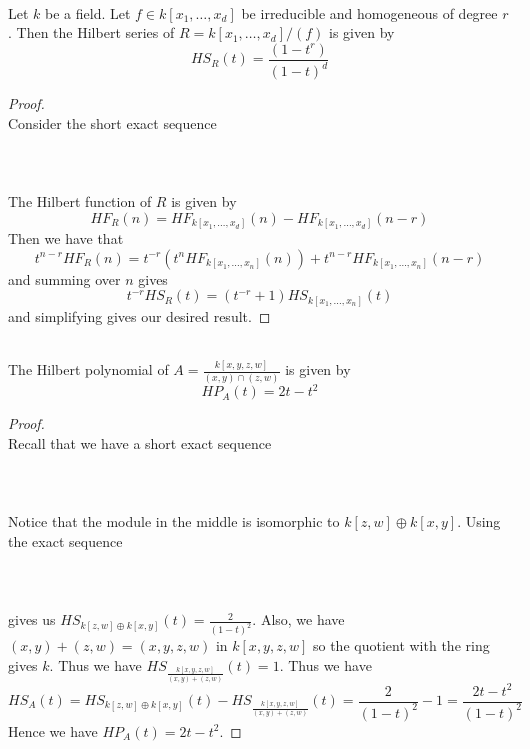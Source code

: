 \documentclass[a4paper]{article}
\begin{document}
\begin{eg}{}{}\\
Let $k$ be a field. Let $f\in k[x_1,\dots,x_d]$ be irreducible and homogeneous of degree $r$. Then the Hilbert series of $R=k[x_1,\dots,x_d]/(f)$ is given by $$HS_R(t)=\frac{(1-t^r)}{(1-t)^d}$$
\begin{proof}\\
Consider the short exact sequence \\~\\
 \\~\\
The Hilbert function of $R$ is given by $$HF_R(n)=HF_{k[x_1,\dots,x_d]}(n)-HF_{k[x_1,\dots,x_d]}(n-r)$$ Then we have that $$t^{n-r}HF_R(n)=t^{-r}(t^n HF_{k[x_1,\dots,x_n]}(n))+t^{n-r}HF_{k[x_1,\dots,x_n]}(n-r)$$ and summing over $n$ gives $$t^{-r}HS_R(t)=(t^{-r}+1)HS_{k[x_1,\dots,x_n]}(t)$$ and simplifying gives our desired result. 
\end{proof}
\end{eg}

\begin{eg}{}{}\\
The Hilbert polynomial of $A=\frac{k[x,y,z,w]}{(x,y)\cap(z,w)}$ is given by $$HP_A(t)=2t-t^2$$
\begin{proof}\\
Recall that we have a short exact sequence \\~\\
\\~\\
Notice that the module in the middle is isomorphic to $k[z,w]\oplus k[x,y]$. Using the exact sequence \\~\\
\\~\\
gives us $HS_{k[z,w]\oplus k[x,y]}(t)=\frac{2}{(1-t)^2}$. Also, we have $(x,y)+(z,w)=(x,y,z,w)$ in $k[x,y,z,w]$ so the quotient with the ring gives $k$. Thus we have $HS_{\frac{k[x,y,z,w]}{(x,y)+(z,w)}}(t)=1$. Thus we have $$HS_A(t)=HS_{k[z,w]\oplus k[x,y]}(t)-HS_{\frac{k[x,y,z,w]}{(x,y)+(z,w)}}(t)=\frac{2}{(1-t)^2}-1=\frac{2t-t^2}{(1-t)^2}$$ Hence we have $HP_A(t)=2t-t^2$. 
\end{proof}
\end{eg}
\end{document}
